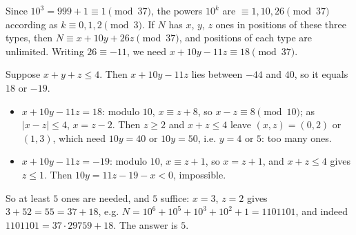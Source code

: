 Since $10^3=999+1\equiv1\pmod{37}$, the powers $10^k$ are $\equiv1,10,26\pmod{37}$ according as $k\equiv0,1,2\pmod3$. If $N$ has $x$, $y$, $z$ ones in positions of these three types, then $N\equiv x+10y+26z\pmod{37}$, and positions of each type are unlimited. Writing $26\equiv-11$, we need $x+10y-11z\equiv18\pmod{37}$.

Suppose $x+y+z\le4$. Then $x+10y-11z$ lies between $-44$ and $40$, so it equals $18$ or $-19$.
\begin{itemize}
\item $x+10y-11z=18$: modulo $10$, $x\equiv z+8$, so $x-z\equiv8\pmod{10}$; as $|x-z|\le4$, $x=z-2$. Then $z\ge2$ and $x+z\le4$ leave $(x,z)=(0,2)$ or $(1,3)$, which need $10y=40$ or $10y=50$, i.e. $y=4$ or $5$: too many ones.
\item $x+10y-11z=-19$: modulo $10$, $x\equiv z+1$, so $x=z+1$, and $x+z\le4$ gives $z\le1$. Then $10y=11z-19-x<0$, impossible.
\end{itemize}
So at least $5$ ones are needed, and $5$ suffice: $x=3$, $z=2$ gives $3+52=55=37+18$, e.g. $N=10^6+10^5+10^3+10^2+1=1101101$, and indeed $1101101=37\cdot29759+18$. The answer is $\boxed{5}$.
